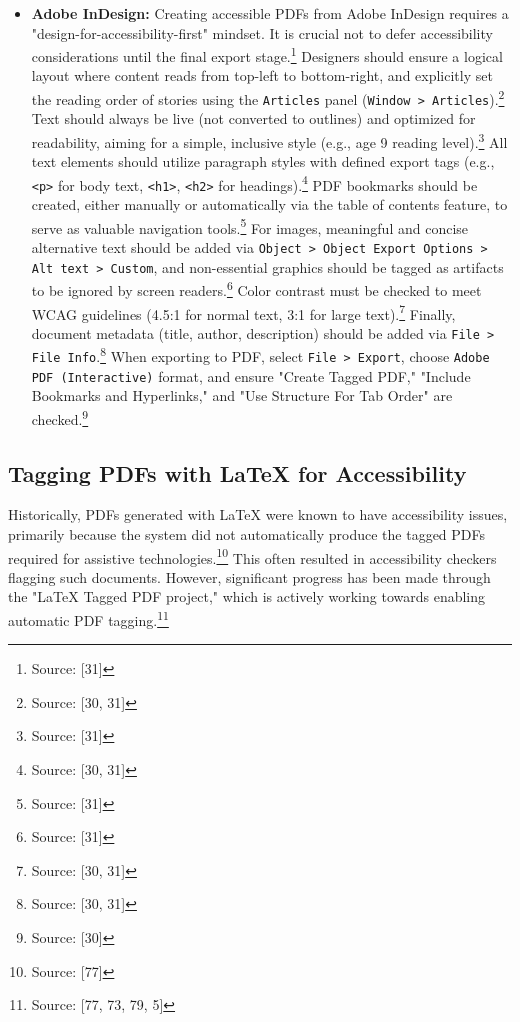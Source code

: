 \begin{itemize}[noitemsep,topsep=0pt]
    \item \textbf{Adobe InDesign:} Creating accessible PDFs from Adobe InDesign requires a "design-for-accessibility-first" mindset. It is crucial not to defer accessibility considerations until the final export stage.\footnote{Source: [31]} Designers should ensure a logical layout where content reads from top-left to bottom-right, and explicitly set the reading order of stories using the \texttt{Articles} panel (\texttt{Window > Articles}).\footnote{Source: [30, 31]} Text should always be live (not converted to outlines) and optimized for readability, aiming for a simple, inclusive style (e.g., age 9 reading level).\footnote{Source: [31]} All text elements should utilize paragraph styles with defined export tags (e.g., \texttt{<p>} for body text, \texttt{<h1>}, \texttt{<h2>} for headings).\footnote{Source: [30, 31]} PDF bookmarks should be created, either manually or automatically via the table of contents feature, to serve as valuable navigation tools.\footnote{Source: [31]} For images, meaningful and concise alternative text should be added via \texttt{Object > Object Export Options > Alt text > Custom}, and non-essential graphics should be tagged as artifacts to be ignored by screen readers.\footnote{Source: [31]} Color contrast must be checked to meet WCAG guidelines (4.5:1 for normal text, 3:1 for large text).\footnote{Source: [30, 31]} Finally, document metadata (title, author, description) should be added via \texttt{File > File Info}.\footnote{Source: [30, 31]} When exporting to PDF, select \texttt{File > Export}, choose \texttt{Adobe PDF (Interactive)} format, and ensure "Create Tagged PDF," "Include Bookmarks and Hyperlinks," and "Use Structure For Tab Order" are checked.\footnote{Source: [30]}
\end{itemize}

\subsection{Tagging PDFs with LaTeX for Accessibility}

Historically, PDFs generated with LaTeX were known to have accessibility issues, primarily because the system did not automatically produce the tagged PDFs required for assistive technologies.\footnote{Source: [77]} This often resulted in accessibility checkers flagging such documents. However, significant progress has been made through the "LaTeX Tagged PDF project," which is actively working towards enabling automatic PDF tagging.\footnote{Source: [77, 73, 79, 5]}


